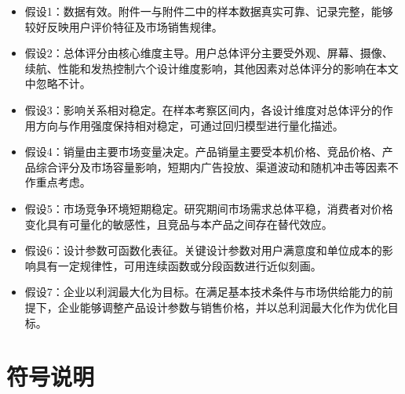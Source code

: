 \documentclass[withoutpreface,bwprint]{cumcmthesis} %
\begin{document}
\begin{itemize}
    \item {\heiti 假设1：数据有效。}附件一与附件二中的样本数据真实可靠、记录完整，能够较好反映用户评价特征及市场销售规律。

    \item {\heiti 假设2：总体评分由核心维度主导。}用户总体评分主要受外观、屏幕、摄像、续航、性能和发热控制六个设计维度影响，其他因素对总体评分的影响在本文中忽略不计。

    \item {\heiti 假设3：影响关系相对稳定。}在样本考察区间内，各设计维度对总体评分的作用方向与作用强度保持相对稳定，可通过回归模型进行量化描述。

    \item {\heiti 假设4：销量由主要市场变量决定。}产品销量主要受本机价格、竞品价格、产品综合评分及市场容量影响，短期内广告投放、渠道波动和随机冲击等因素不作重点考虑。

    \item {\heiti 假设5：市场竞争环境短期稳定。}研究期间市场需求总体平稳，消费者对价格变化具有可量化的敏感性，且竞品与本产品之间存在替代效应。

    \item {\heiti 假设6：设计参数可函数化表征。}关键设计参数对用户满意度和单位成本的影响具有一定规律性，可用连续函数或分段函数进行近似刻画。

    \item {\heiti 假设7：企业以利润最大化为目标。}在满足基本技术条件与市场供给能力的前提下，企业能够调整产品设计参数与销售价格，并以总利润最大化作为优化目标。
\end{itemize}


\section{符号说明}

\renewcommand{\arraystretch}{1.15}
\end{document}
